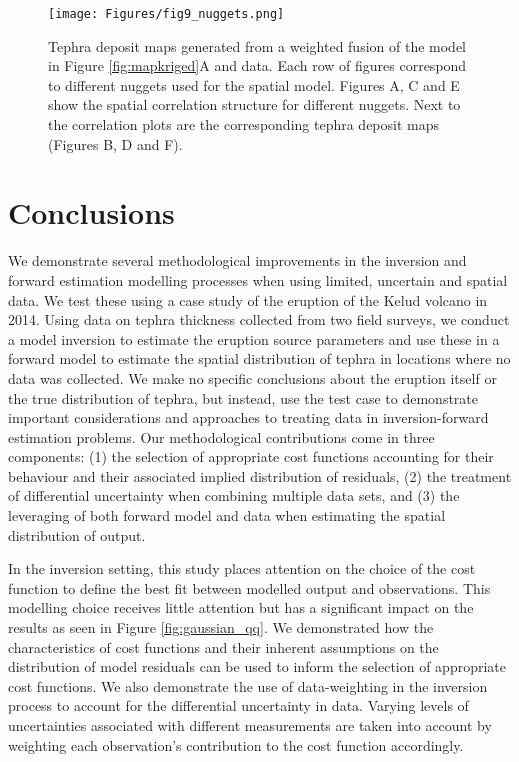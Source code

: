     \begin{figure}[htbp!]
    \centering
    \texttt{[image: Figures/fig9\_nuggets.png]}
    \caption{Tephra deposit maps generated from a weighted fusion of the model in Figure \ref{fig:mapkriged}A and data. Each row of figures correspond to different nuggets used for the spatial model. Figures A, C and E show the spatial correlation structure for different nuggets. Next to the correlation plots are the corresponding tephra deposit maps (Figures B, D and F).}
    \label{fig:mapnuggets}
    \end{figure}


\section{Conclusions}\label{section-conclusion}

We demonstrate several methodological improvements in the inversion and forward estimation modelling processes when using limited, uncertain and spatial data. We test these using a case study of the eruption of the Kelud volcano in 2014. Using data on tephra thickness collected from two field surveys, we conduct a model inversion to estimate the eruption source parameters and use these in a forward model to estimate the spatial distribution of tephra in locations where no data was collected. We make no specific conclusions about the eruption itself or the true distribution of tephra, but instead, use the test case to demonstrate important considerations and approaches to treating data in inversion-forward estimation problems. Our methodological contributions come in three components: (1) the selection of appropriate cost functions accounting for their behaviour and their associated implied distribution of residuals, (2) the treatment of differential uncertainty when combining multiple data sets, and (3) the leveraging of both forward model and data when estimating the spatial distribution of output.

In the inversion setting, this study places attention on the choice of the cost function to define the best fit between modelled output and observations. This modelling choice receives little attention but has a significant impact on the results as seen in Figure \ref{fig:gaussian_qq}. We demonstrated how the characteristics of cost functions and their inherent assumptions on the distribution of model residuals can be used to inform the selection of appropriate cost functions. We also demonstrate the use of data-weighting in the inversion process to account for the differential uncertainty in data. Varying levels of uncertainties associated with different measurements are taken into account by weighting each observation's contribution to the cost function accordingly.

